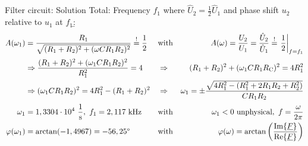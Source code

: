 \begin{frame}[allowframebreaks]
\begin{expl}{Filter circuit: Solution}{}
    Total: Frequency $f_{1}$ where $\hat{U}_2 = \frac{1}{2}\hat{U}_1$ and phase shift $u_2$ relative to $u_1$ at $f_1$:\b{\hfill}\vspace{-10pt}%
        \begin{align*}%
        A(\omega_1) &= \frac{R_1}{\sqrt{(R_1+R_2)^2+(\omega CR_1R_2)^2}} \overset{!}{=} \frac{1}{2} & 
        &\text{with}&
        A(\omega) = \frac{U_2}{U_1} = \frac{\hat{U}_2}{\hat{U}_1} \overset{!}{=} \left.\frac{1}{2}\right|_{f=f_1}
        \\[+2pt]
        &\Rightarrow \frac{(R_1+R_2)^2 + (\omega_1 CR_1R_2)^2}{R_1^2} = 4 &
        &\Rightarrow &
        (R_1+R_2)^2 + (\omega_1 C R_1R_{\mathrm{C}})^2 = 4R_1^2
        \\
        &\Rightarrow (\omega_1 CR_1R_2)^2 = 4R_1^2 - (R_1+R_2)^2 &
        &\Rightarrow&
        \omega_1 = \pm \frac{\sqrt{4R_1^2 - (R_1^2 + 2R_1R_2 + R_2^2)}}{CR_1R_2}
        \\[+2pt]
        \omega_1 &= 1,3304\cdot 10^4\ \frac{1}{\mathrm{s}},\ f_1 = 2,117\ \mathrm{kHz} &
        &\text{with}&
        \omega_1 < 0 \text{ unphysical},\ f=\frac{\omega}{2\pi}
        \\
        \varphi(\omega_1) &= \arctan(-1,4967) = -56,25\degree &
        &\text{with}&
        \varphi(\omega) = \arctan\left(\frac{\Im\{\underline{F}\}}{\Re\{\underline{F}\}}\right)
    \end{align*}
\end{expl}%
\end{frame}